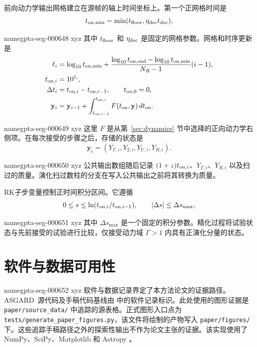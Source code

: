 \documentclass[twocolumn]{aastex702}
\makeatletter
\newcommand{\asgard}{\textsc{ASGARD}}
\providecommand{\gptareaderanchor}[1]{\pdfdest name{#1} xyz}%
\providecommand{\gptareaderanchor}[1]{\special{pdf:dest (#1) [ @thispage /XYZ @xpos @ypos null ]}}%
\makeatother
\begin{document}
前向动力学输出网格建立在源帧的轴上时间坐标上。第一个正网格时间是
\begin{equation}
t_{{\rm on},\min}=\min(t_{\rm floor},\eta_{\rm dec}t_{\rm dec}) ,
\end{equation}

\gptareaderanchor{gpta-seg-000648}%
其中 \(t_{\rm floor}\) 和 \(\eta_{\rm dec}\) 是固定的网格参数。网格和时序更新是
\begin{equation}
\begin{aligned}
\ell_i&=\log_{10}t_{{\rm on},\min}
+\frac{\log_{10}t_{{\rm on},\rm end}
-\log_{10}t_{{\rm on},\min}}{N_R-1}(i-1),\\
t_{{\rm on},i}&=10^{\ell_i},\\
\Delta t_i&=t_{{\rm on},i}-t_{{\rm on},i-1},\qquad t_{{\rm on},0}=0,\\
\mathbf{y}_i&=\mathbf{y}_{i-1}
+\int_{t_{{\rm on},i-1}}^{t_{{\rm on},i}}
F(t_{\rm on},\mathbf{y})\,dt_{\rm on}.
\end{aligned}
\end{equation}

\gptareaderanchor{gpta-seg-000649}%
这里 \(F\) 是从第~\ref{sec:dynamics} 节中选择的正向动力学右侧项。在每次接受的步骤之后，存储的状态是
\begin{equation}
\mathbf{y}_i=(Y_{\Gamma,i},Y_{2,i},Y_{U,i},Y_{R,i}).
\end{equation}

\gptareaderanchor{gpta-seg-000650}%
公共输出数组随后记录 \((1+z)t_{{\rm on},i}\)、\(Y_{\Gamma,i}\)、\(Y_{R,i}\) 以及扫过的质量。演化扫过数柱的分支在写入公共输出之前将其转换为质量。

RK子步变量控制正时间积分区间。它遵循
\begin{equation}
0\le s\le \ln(t_{{\rm on},i}/t_{{\rm on},i-1}),
\qquad
|\Delta s|\le\Delta s_{\max},
\end{equation}

\gptareaderanchor{gpta-seg-000651}%
其中 \(\Delta s_{\max}\) 是一个固定的积分参数。精化过程将试验状态与先前接受的试验进行比较，仅接受动力域 \(\Gamma>1\) 内具有正演化分量的状态。

\section{软件与数据可用性} \label{app:data}


\gptareaderanchor{gpta-seg-000652}%
软件与数据记录界定了本方法论文的证据路径。
\asgard\ 源代码及手稿代码基线由 \citet{ASGARDSoftware} 中的软件记录标识。此处使用的图形证据是 \texttt{paper/source\_data/} 中追踪的源表格。正式图形入口点为 \texttt{tests/generate\_paper\_figures.py}，该文件将绘制的产物写入 \texttt{paper/figures/} 下。这些追踪手稿路径之外的探索性输出不作为论文主张的证据。该实现使用了 NumPy、SciPy、Matplotlib 和 Astropy
\citep{Harris2020,Virtanen2020,Hunter2007,Astropy2022}。

\clearpage



\end{document}
